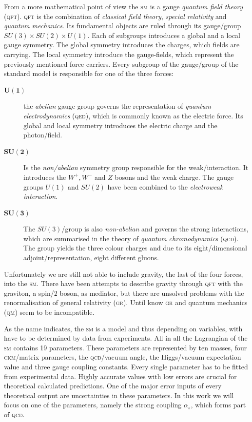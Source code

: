 \documentclass[../../index.tex]{subfiles}
\begin{document}
From a more mathematical point of view the \textsc{sm} is a gauge \textit{
  quantum field theory} (\textsc{qft}). \textsc{qft} is the combination of
\textit{classical field theory}, \textit{special relativity} and \textit{quantum
  mechanics}. Its fundamental objects are ruled through its gauge\-/group
$SU(3)\times SU(2)\times U(1)$. Each of subgroups introduces a global and a
local gauge symmetry. The global symmetry introduces the charges, which fields
are carrying. The local symmetry introduce the gauge-fields, which represent the
previously mentioned force carriers. Every subgroup of the gauge\-/group of the
standard model is responsible for one of the three forces:
\begin{description}
\item[$\bm{U(1)}$] the \textit{abelian} gauge group governs the representation
  of \textit{quantum electrodynamics} (\textsc{qed}), which is commonly known as
  the electric force. Its global and local symmetry introduces the electric
  charge and the photon\-/field.
\item[$\bm{SU(2)}$] Is the \textit{non\-/abelian} symmetry group responsible for
  the weak\-/interaction. It introduces the $W^+,W^-$ and $Z$ bosons and the
  weak charge. The gauge groups $U(1)$ and $SU(2)$ have been combined to the
  \textit{electroweak interaction}.
\item[$\bm{SU(3)}$] The $SU(3)$\-/group is also \textit{non-abelian} and governs
  the strong interactions, which are summarised in the theory of \textit{quantum
    chromodynamics} (\textsc{qcd}). The group yields the three colour charges
  and due to its eight\-/dimensional adjoint\-/representation, eight different
  gluons.
\end{description}
Unfortunately we are still not able to include gravity, the last of the four
forces, into the \textsc{sm}. There have been attempts to describe gravity
through \textsc{qft} with the graviton, a spin\-/2 boson, as mediator, but there
are unsolved problems with the renormalisation of general relativity
(\textsc{gr}). Until know \textsc{gr} and quantum mechanics (\textsc{qm}) seem
to be incompatible.

As the name indicates, the \textsc{sm} is a model and thus depending on
variables, with have to be determined by data from experiments. All in all the
Lagrangian of the \textsc{sm} contains 19 parameters. These parameters are
represented by ten masses, four \textsc{ckm}\-/matrix parameters, the
\textsc{qcd}\-/vacuum angle, the Higgs\-/vacuum expectation value and three
gauge coupling constants. Every single parameter has to be fitted from
experimental data. Highly accurate values with low errors are crucial for
theoretical calculated predictions. One of the major error inputs of every
theoretical output are uncertainties in these parameters. In this work we will
focus on one of the parameters, namely the strong coupling $\alpha_s$, which
forms part of \textsc{qcd}.
\end{document}

